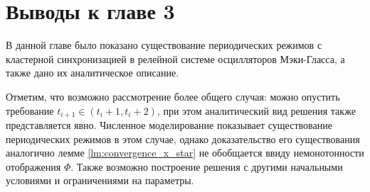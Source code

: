 \section{Выводы к главе 3}\label{sec:ch3/sect6}
В данной главе было показано существование периодических режимов с кластерной синхронизацией в релейной системе осцилляторов Мэки-Гласса, а также дано их аналитическое описание.

Отметим, что возможно рассмотрение более общего случая: можно опустить требование $t_{i + 1} \in (t_{i} + 1, t_{i} + 2)$, при этом аналитический вид решения также представляется явно. Численное моделирование показывает существование периодических режимов в этом случае, однако доказательство его существования аналогично лемме \ref{lm:convergence_x_star} не обобщается ввиду немонотонности отображения $\Phi$. Также возможно построение решения с другими начальными условиями и ограничениями на параметры.
